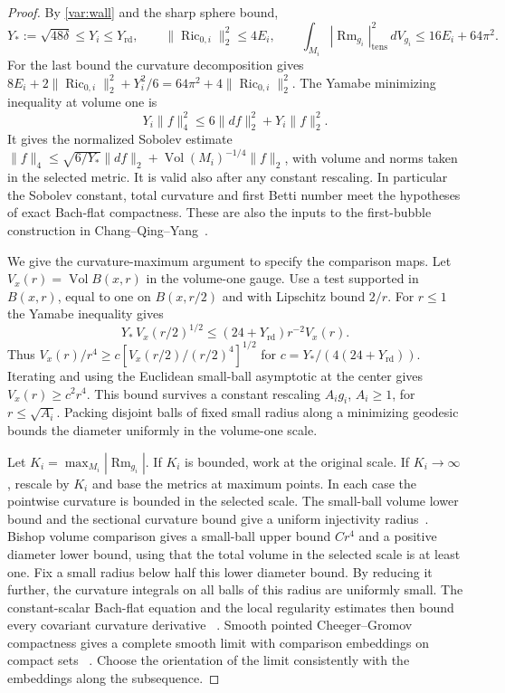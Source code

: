 \documentclass[11pt]{article}
\numberwithin{equation}{section}
\theoremstyle{definition}
\theoremstyle{remark}
\DeclareMathOperator{\Ric}{Ric}
\DeclareMathOperator{\Vol}{Vol}
\DeclareMathOperator{\Rm}{Rm}
\newcommand{\rd}{\mathrm{rd}}
\begin{document}
\begin{proof}
By \eqref{var:wall} and the sharp sphere bound,
\[
 Y_*:=\sqrt{48\delta}\le Y_i\le Y_{\rd},\qquad
 \|\Ric_{0,i}\|_2^2\le4E_i,\qquad
 \int_{M_i}|\Rm_{g_i}|_{\mathrm{tens}}^2\,dV_{g_i}
       \le16E_i+64\pi^2 .
\]
For the last bound the curvature decomposition gives
\(8E_i+2\|\Ric_{0,i}\|_2^2+Y_i^2/6
=64\pi^2+4\|\Ric_{0,i}\|_2^2\).
The Yamabe minimizing inequality at volume one is
\[
 Y_i\|f\|_4^2\le 6\|df\|_2^2+Y_i\|f\|_2^2 .
\]
It gives the normalized Sobolev estimate
\(\|f\|_4\le \sqrt{6/Y_*}\|df\|_2+
\Vol(M_i)^{-1/4}\|f\|_2\), with volume and norms taken
in the selected metric. It is valid also after any constant rescaling.
In particular the Sobolev constant, total curvature and first
Betti number meet the hypotheses of exact Bach-flat compactness.
These are also the inputs to the first-bubble construction in
Chang--Qing--Yang~\cite[\S\S2 and 4]{ChangQingYang2006Gap}.

We give the curvature-maximum argument to specify the comparison maps.
Let \(V_x(r)=\Vol B(x,r)\) in the volume-one gauge.
Use a test supported in \(B(x,r)\), equal to one on \(B(x,r/2)\)
and with Lipschitz bound \(2/r\). For \(r\le1\) the Yamabe
inequality gives
\[
 Y_*\,V_x(r/2)^{1/2}\le (24+Y_{\rd})r^{-2}V_x(r).
\]
Thus \(V_x(r)/r^4\ge c[V_x(r/2)/(r/2)^4]^{1/2}\) for
\(c=Y_*/(4(24+Y_{\rd}))\). Iterating and using the Euclidean
small-ball asymptotic at the center gives \(V_x(r)\ge c^2r^4\).
This bound survives a constant rescaling \(A_i g_i\), \(A_i\ge1\),
for \(r\le\sqrt{A_i}\).
Packing disjoint balls of fixed small radius along a minimizing
geodesic bounds the diameter uniformly in the volume-one scale.

Let \(K_i=\max_{M_i}|\Rm_{g_i}|\). If \(K_i\) is bounded, work
at the original scale. If \(K_i\to\infty\), rescale by \(K_i\) and
base the metrics at maximum points. In each case the pointwise
curvature is bounded in the selected scale. The small-ball volume
lower bound and the sectional curvature bound give a uniform
injectivity radius~\cite[Theorem 4.7]{CheegerGromovTaylor1982}.
Bishop volume comparison gives a small-ball upper bound \(Cr^4\)
and a positive diameter lower bound, using that the total volume
in the selected scale is at least one. Fix a small radius below
half this lower diameter bound. By reducing it further, the
curvature integrals on all balls of this radius are uniformly small.
The constant-scalar Bach-flat equation and the local regularity
estimates then bound every covariant curvature derivative
~\cite[\S2.1 and Theorem 4.1]{TianViaclovsky2004Moduli}.
Smooth pointed Cheeger--Gromov compactness gives a complete
smooth limit with comparison embeddings on compact sets
~\cite[Definition 1.1 and \S2]{AndersonCheegerGromovAuthorSurvey}.
Choose the orientation of the limit consistently with the
embeddings along the subsequence.


\end{proof}
\end{document}
